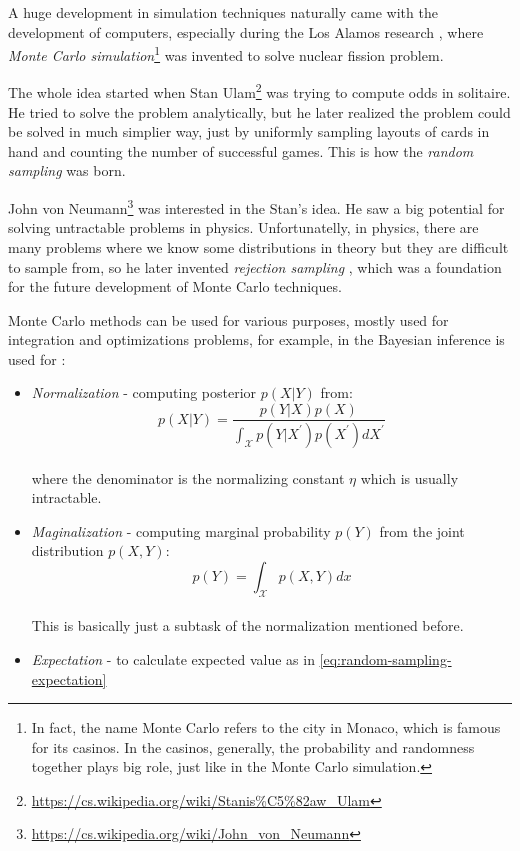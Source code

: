 \documentclass[
  digital, %
  oneside, %
  lof,     %
  lot,     %
]{fithesis4}
\begin{document}
A huge development in simulation techniques 
naturally came with the development of computers, 
especially during the Los Alamos research 
\cite{metropolis1987}, where 
\textit{Monte Carlo simulation}\footnote{
In fact, the name Monte Carlo refers to the city 
in Monaco, which is famous for its casinos. 
In the casinos, generally, the probability and 
randomness together plays big role, just like in the 
Monte Carlo simulation.
} was invented to 
solve nuclear fission problem.

The whole idea started when Stan Ulam\footnote{\url{https://cs.wikipedia.org/wiki/Stanis\%C5\%82aw_Ulam}} was
trying to compute odds in solitaire.
He tried to solve the problem analytically, but he later
realized the problem could be solved in much simplier way,
just by uniformly sampling layouts of cards in hand and
counting the number of successful games.
This is how the \textit{random sampling} was born.

John von Neumann\footnote{\url{https://cs.wikipedia.org/wiki/John_von_Neumann}}
was interested in the Stan's idea. He saw a big potential for
solving untractable problems in physics.
Unfortunatelly, in physics, there are many problems where
we know some distributions in theory but they are difficult
to sample from, so he later invented 
\textit{rejection sampling} \cite{beichl2000}, which 
was a foundation for the future development of 
Monte Carlo techniques.

Monte Carlo methods can be used for various 
purposes, mostly used for integration and
optimizations problems,
for example, in the Bayesian inference is used for \cite{andrieu2003}:

\begin{itemize}
  \item \textit{Normalization} - computing posterior $p(X | Y)$ from:
    \begin{equation}
      p(X | Y) = \frac{p(Y | X) p(X)}{\int_{\mathcal{X}} p(Y | X^\prime) p(X^\prime) dX^\prime}
    \end{equation} \\
    where the denominator is the normalizing constant $\eta$ which is usually intractable.
  \item \textit{Maginalization} - computing marginal probability $p(Y)$ from the joint distribution $p(X, Y)$:
    \begin{equation}
      p(Y) = \int_{\mathcal{X}} p(X, Y) dx
    \end{equation} \\
    This is basically just a subtask of the normalization mentioned before.
  \item \textit{Expectation} - to calculate expected value as in \eqref{eq:random-sampling-expectation}
\end{itemize}
\end{document}
